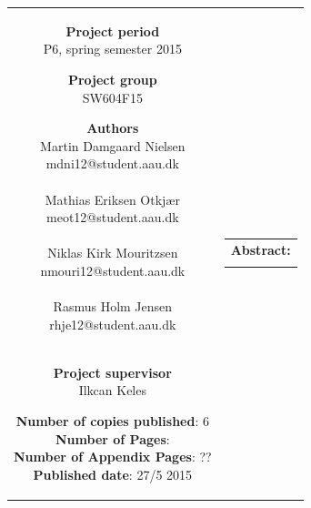 \begin{nopagebreak}
{\begin{tabular}{cc}
{        \textbf{Project period} \\ 
        P6, spring semester 2015 \\

        \textbf{Project group} \\
        SW604F15 \\

        \textbf{Authors} \\
        Martin Damgaard Nielsen\\
        mdni12@student.aau.dk 
        \\\\
        Mathias Eriksen Otkjær\\
        meot12@student.aau.dk 
        \\\\
        Niklas Kirk Mouritzsen\\
        nmouri12@student.aau.dk 
        \\\\
        Rasmus Holm Jensen\\
        rhje12@student.aau.dk 
        \\\\

        \textbf{Project supervisor} \\ 
        Ilkcan Keles \\

        \textbf{Number of copies published}: 6 \\
        \textbf{Number of Pages}: \pageref{LastPage} \\
        \textbf{Number of Appendix Pages}: ?? \\
        \textbf{Published date}: 27/5 2015 \\

        \vfill 

    } &
    \parbox{7cm}
    {
        \vspace{.15cm}
        \hfill 
        \begin{tabular}{l}
            {\bf Abstract:}\bigskip \\
            \fbox{
                \parbox{7cm}
                {
                    \bigskip
                    {\vfill{\small \bigskip}}
                }
            }
        \end{tabular}
    }

\end{tabular}}
\\ \\ \\ \\ \\ \\ \\ 
\begin{center}
\end{center}

\restoregeometry
\end{nopagebreak}